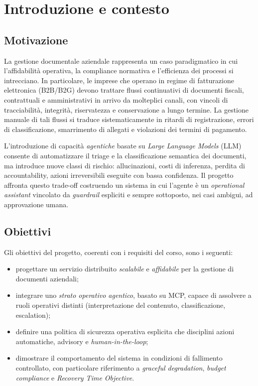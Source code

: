 \documentclass[11pt,a4paper,oneside]{article}
\begin{document}
\tableofcontents
\newpage

\section{Introduzione e contesto}

\subsection{Motivazione}
La gestione documentale aziendale rappresenta un caso paradigmatico in cui
l'affidabilit\`a operativa, la compliance normativa e l'efficienza dei processi
si intrecciano. In particolare, le imprese che operano in regime di fatturazione
elettronica (B2B/B2G) devono trattare flussi continuativi di documenti
fiscali, contrattuali e amministrativi in arrivo da molteplici canali, con
vincoli di tracciabilit\`a, integrit\`a, riservatezza e conservazione a lungo
termine. La gestione manuale di tali flussi si traduce sistematicamente in
ritardi di registrazione, errori di classificazione, smarrimento di
allegati e violazioni dei termini di pagamento.

L'introduzione di capacit\`a \emph{agentiche} basate su \emph{Large Language Models}
(LLM) consente di automatizzare il triage e la classificazione semantica dei
documenti, ma introduce nuove classi di rischio: allucinazioni, costi di
inferenza, perdita di accountability, azioni irreversibili eseguite con bassa
confidenza. Il progetto affronta questo trade-off costruendo un sistema in cui
l'agente \`e un \emph{operational assistant} vincolato da \emph{guardrail}
espliciti e sempre sottoposto, nei casi ambigui, ad approvazione umana.

\subsection{Obiettivi}
Gli obiettivi del progetto, coerenti con i requisiti del corso, sono i seguenti:
\begin{itemize}[leftmargin=*]
    \item progettare un servizio distribuito \emph{scalabile} e \emph{affidabile}
          per la gestione di documenti aziendali;
    \item integrare uno \emph{strato operativo agentico}, basato su MCP, capace
          di assolvere a ruoli operativi distinti (interpretazione del contenuto,
          classificazione, escalation);
    \item definire una politica di sicurezza operativa esplicita che disciplini
          azioni automatiche, advisory e \emph{human-in-the-loop};
    \item dimostrare il comportamento del sistema in condizioni di fallimento
          controllato, con particolare riferimento a \emph{graceful degradation},
          \emph{budget compliance} e \emph{Recovery Time Objective}.
\end{itemize}
\end{document}
